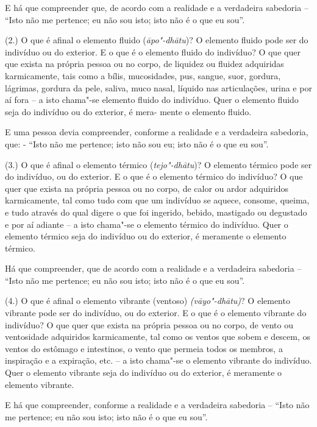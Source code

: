 E há que compreender que, de acordo com a realidade e a verdadeira sabedoria --
“Isto não me pertence; eu não sou isto; isto não é o que eu sou”.

(2.) O que é afinal o elemento fluido (\emph{āpo"-dhātu})? O elemento fluido pode
ser do indivíduo ou do exterior. E o que é o elemento fluido do indivíduo? O que
quer que exista na própria pessoa ou no corpo, de liquidez ou fluidez adquiridas
karmicamente, tais como a bílis, mucosidades, pus, sangue, suor, gordura,
lágrimas, gordura da pele, saliva, muco nasal, líquido nas articulações, urina e
por aí fora -- a isto chama"-se elemento fluido do indivíduo. Quer o elemento
fluido seja do indivíduo ou do exterior, é mera- mente o elemento fluido.

E uma pessoa devia compreender, conforme a realidade e a verdadeira sabedoria,
que: - “Isto não me pertence; isto não sou eu; isto não é o que eu sou”.

(3.) O que é afinal o elemento térmico (\emph{tejo"-dhātu})? O elemento térmico
pode ser do indivíduo, ou do exterior. E o que é o elemento térmico do
indivíduo? O que quer que exista na própria pessoa ou no corpo, de calor ou
ardor adquiridos karmicamente, tal como tudo com que um indivíduo se aquece,
consome, queima, e tudo através do qual digere o que foi ingerido, bebido,
mastigado ou degustado e por aí adiante -- a isto chama"-se o elemento térmico do
indivíduo. Quer o elemento térmico seja do indivíduo ou do exterior, é meramente
o elemento térmico.

Há que compreender, que de acordo com a realidade e a verdadeira sabedoria --
“Isto não me pertence; eu não sou isto; isto não é o que eu sou”.

\enlargethispage{\baselineskip}

(4.) O que é afinal o elemento vibrante (ventoso) \emph{(vāyo"-dhātu)}? O
elemento vibrante pode ser do indivíduo, ou do exterior. E o que é o elemento
vibrante do indivíduo? O que quer que exista na própria pessoa ou no corpo, de
vento ou ventosidade adquiridos karmicamente, tal como os ventos que sobem e
descem, os ventos do estômago e intestinos, o vento que permeia todos os
membros, a inspiração e a expiração, etc. -- a isto chama"-se o elemento vibrante
do indivíduo. Quer o elemento vibrante seja do indivíduo ou do exterior, é
meramente o elemento vibrante.

E há que compreender, conforme a realidade e a verdadeira sabedoria -- “Isto
não me pertence; eu não sou isto; isto não é o que eu sou”.


